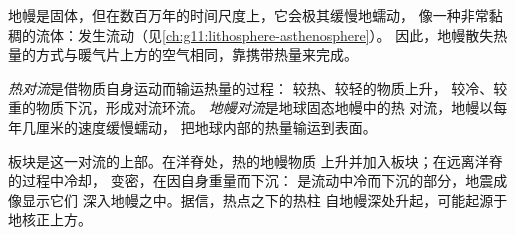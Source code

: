 地幔是固体，但在数百万年的时间尺度上，它会极其缓慢地蠕动，
像一种非常黏稠的流体：发生流动（见\cref{ch:g11:lithosphere-asthenosphere}）。
因此，地幔散失热量的方式与暖气片上方的空气相同，靠携带热量来完成。

\begin{definition}\label{def:g12:internal-heat:convection}
\emph{热对流}是借物质自身运动而输运热量的过程：
较热、较轻的物质上升，
较冷、较重的物质下沉，形成对流环流。
\emph{地幔对流}是地球固态地幔中的热
对流，地幔以每年几厘米的速度缓慢蠕动，
把地球内部的热量输运到表面。
\end{definition}

板块是这一对流的上部。在洋脊处，热的地幔物质
上升并加入板块；在远离洋脊的过程中冷却，
变密，在因自身重量而下沉：
是流动中冷而下沉的部分，地震成像显示它们
深入地幔之中。据信，热点之下的热柱
自地幔深处升起，可能起源于地核正上方。

